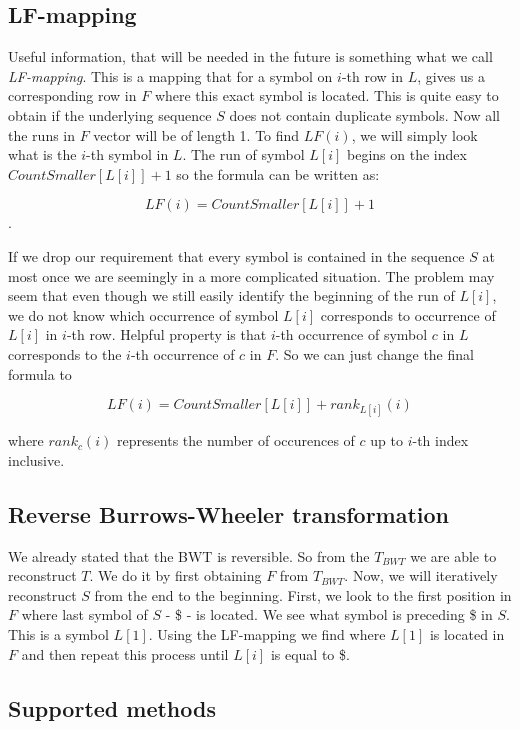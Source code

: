 \subsection{LF-mapping}

Useful information, that will be needed in the future is something what we call \textit{LF-mapping}.
This is a mapping that for a symbol on $i$-th row in $L$, gives us a corresponding row in $F$
where this exact symbol is located. This is quite easy to obtain if the underlying sequence $S$
does not contain duplicate symbols. Now all the runs in $F$ vector will be of length 1.
To find $LF(i)$, we will simply look what is the $i$-th symbol in $L$. The run of
symbol $L[i]$ begins on the index $CountSmaller[L[i]] + 1$ so the formula can be written as:

$$LF(i) = CountSmaller[L[i]] + 1$$.

If we drop our requirement that every symbol is contained in the sequence $S$ at most once
we are seemingly in a more complicated situation. The problem may seem that even
though we still easily identify the beginning of the run of $L[i]$, we do not
know which occurrence of symbol $L[i]$ corresponds to occurrence of $L[i]$ in $i$-th row.
Helpful property is that $i$-th occurrence of symbol $c$ in $L$ corresponds to the
$i$-th occurrence of $c$ in $F$. So we can just change the final formula to

				$$LF(i) = CountSmaller[L[i]] + rank_{L[i]}(i)$$

where $rank_c(i)$ represents the number of occurences of $c$ up to $i$-th index inclusive.

\subsection{Reverse Burrows-Wheeler transformation}

We already stated that the BWT is reversible. So from the $T_{BWT}$ we are able to reconstruct
$T$. We do it by first obtaining $F$ from $T_{BWT}$. Now, we will iteratively reconstruct $S$
from the end to the beginning. First, we look to the first position in $F$ where last symbol
of $S$ - \$ - is located. We see what symbol is preceding \$ in $S$. This is a symbol
$L[1]$. Using the LF-mapping we find where $L[1]$ is located in $F$ and then repeat this process
until $L[i]$ is equal to \$.

\subsection{Supported methods}

